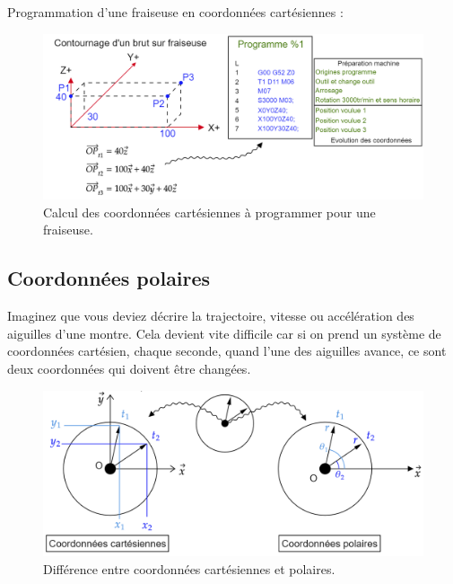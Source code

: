\documentclass[
	11pt, %
	fleqn, %
	a4paper, %
]{LegrandOrangeBook}
\begin{document}
Programmation d'une fraiseuse en coordonnées cartésiennes :



\begin{figure}[H] %
	\centering %
	\includegraphics[width=1\textwidth]{Images/cart3.png} %
	\caption{Calcul des coordonnées cartésiennes à programmer pour une fraiseuse.}
	\label{cart3} %
\end{figure}


\subsection{Coordonnées polaires}
Imaginez que vous deviez décrire la trajectoire,  vitesse ou accélération des aiguilles d'une montre. Cela devient vite difficile car si on prend un système de coordonnées cartésien, chaque seconde, quand l'une des aiguilles avance, ce sont deux coordonnées qui doivent être changées. 

\begin{figure}[H] %
	\centering %
	\includegraphics[width=1\textwidth]{Images/pol1.png} %
	\caption{Différence entre coordonnées cartésiennes et polaires.}
	\label{pol1} %
\end{figure}
\end{document}
